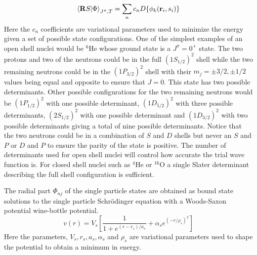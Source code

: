 \begin{equation}
   \left< \mathbf{R} S | \Phi \right>_{J^\pi,T} = \sum\limits_n c_n D\{\phi_k(\mathbf{r}_i,s_i)\}
\end{equation}
Here the $c_n$ coefficients are variational parameters used to minimize the energy given a set of possible state configurations. One of the simplest examples of an open shell nuclei would be $^6$He whose ground state is a $J^\pi = 0^+$ state. The two protons and two of the neutrons could be in the full $(1S_{1/2})^2$ shell while the two remaining neutrons could be in the $(1P_{3/2})^2$ shell with their $m_j=\pm 3/2, \pm 1/2$ values being equal and opposite to ensure that $J=0$. This state has two possible determinants. Other possible configurations for the two remaining neutrons would be $(1P_{1/2})^2$ with one possible determinant, $(1D_{5/2})^2$ with three possible determinants, $(2S_{1/2})^2$ with one possible determinant and $(1D_{3/2})^2$ with two possible determinants giving a total of nine possible determinants. Notice that the two neutrons could be in a combination of $S$ and $D$ shells but never an $S$ and $P$ or $D$ and $P$ to ensure the parity of the state is positive. The number of determinants used for open shell nuclei will control how accurate the trial wave function is. For closed shell nuclei such as $^4$He or $^{16}$O a single Slater determinant describing the full shell configuration is sufficient.

The radial part $\Phi_{nj}$ of the single particle states are obtained as bound state solutions to the single particle Schr\"odinger equation with a Woods-Saxon potential wine-bottle potential.
\begin{equation}
   v(r) = V_s\left[\frac{1}{1+e^{(r-r_s)/a_s}} + \alpha_se^{(-r/\rho_s)^2}\right]
\end{equation}
Here the parameters, $V_s, r_s, a_s, \alpha_s$ and $\rho_s$ are variational parameters used to shape the potential to obtain a minimum in energy.

